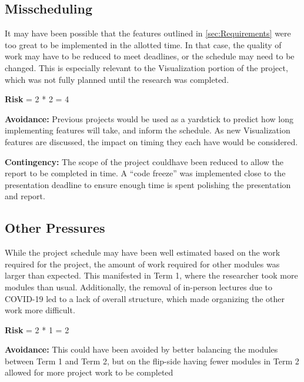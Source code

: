 \subsection{Misscheduling}
It may have been possible that the features outlined in \cref{sec:Requirements} were too great to be implemented in the allotted time.
In that case, the quality of work may have to be reduced to meet deadlines, or the schedule may need to be changed.
This is especially relevant to the Visualization portion of the project, which was not fully planned until the research was completed.

\textbf{Risk} = 2 * 2 = 4

\textbf{Avoidance:}
Previous projects would be used as a yardstick to predict how long implementing features will take, and inform the schedule.
As new Visualization features are discussed, the impact on timing they each have would be considered.

\textbf{Contingency:}
The scope of the project couldhave been reduced to allow the report to be completed in time.
A ``code freeze'' was implemented close to the presentation deadline to ensure enough time is spent polishing the presentation and report.

\subsection{Other Pressures}
While the project schedule may have been well estimated based on the work required for the project, the amount of work required for other modules was larger than expected.
This manifested in Term 1, where the researcher took more modules than usual. 
Additionally, the removal of in-person lectures due to COVID-19 led to a lack of overall structure, which made organizing the other work more difficult.

\textbf{Risk} = 2 * 1 = 2

\textbf{Avoidance:}
This could have been avoided by better balancing the modules between Term 1 and Term 2, but on the flip-side having fewer modules in Term 2 allowed for more project work to be completed

